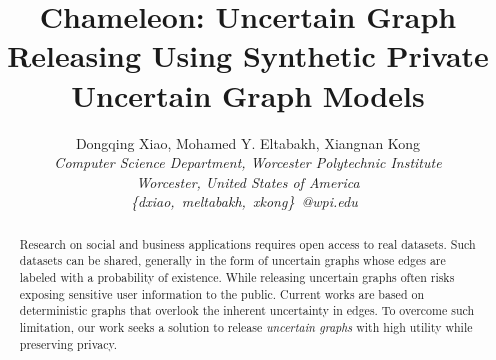 \documentclass[10pt,conference,letterpaper]{IEEEtran}
\title{Chameleon: Uncertain Graph Releasing Using Synthetic Private Uncertain Graph Models}
\author{%
{Dongqing Xiao, Mohamed Y. Eltabakh, Xiangnan Kong}%
\vspace{1.4mm}\\
\fontsize{10}{10}\selectfont\itshape
Computer Science Department, Worcester Polytechnic Institute \\
Worcester, United States of America\\
\fontsize{9}{9}\selectfont\ttfamily\upshape
\{dxiao,~meltabakh,~xkong\}~@wpi.edu\
}
\theoremstyle{plain}
\begin{document}
\maketitle


%

\begin{abstract}  
Research on social and business applications requires open access to real datasets. Such datasets can be shared, generally in the form of uncertain graphs whose edges are labeled with a probability of existence. While releasing uncertain graphs often risks exposing sensitive user information to the public. Current works are based on deterministic graphs that overlook the inherent uncertainty in edges.
To overcome such limitation, our work seeks a solution to release \emph{uncertain graphs} with high utility while preserving privacy. 
\end{abstract}







\end{document}
